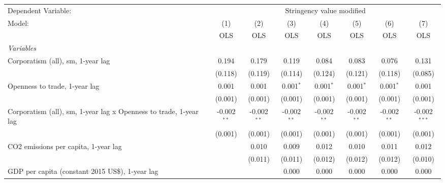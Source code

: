 
\begingroup
\centering
\begin{tabular}{lccccccc}
   \toprule
   Dependent Variable: & \multicolumn{7}{c}{Stringency value modified}\\
   Model:                                                            & (1)           & (2)           & (3)           & (4)           & (5)           & (6)           & (7)\\  
                                                                     &  OLS          & OLS           & OLS           & OLS           & OLS           & OLS           & OLS\\  
   \midrule
   \emph{Variables}\\
   Corporatism (all), sm, 1-year lag                                 & 0.194         & 0.179         & 0.119         & 0.084         & 0.083         & 0.076         & 0.131\\   
                                                                     & (0.118)       & (0.119)       & (0.114)       & (0.124)       & (0.121)       & (0.118)       & (0.085)\\   
   Openness to trade, 1-year lag                                     & 0.001         & 0.001         & 0.001$^{*}$   & 0.001$^{*}$   & 0.001$^{*}$   & 0.001$^{*}$   & 0.001\\   
                                                                     & (0.001)       & (0.001)       & (0.001)       & (0.001)       & (0.001)       & (0.001)       & (0.001)\\   
   Corporatism (all), sm, 1-year lag x Openness to trade, 1-year lag & -0.002$^{**}$ & -0.002$^{**}$ & -0.002$^{**}$ & -0.002$^{**}$ & -0.002$^{**}$ & -0.002$^{**}$ & -0.002$^{***}$\\   
                                                                     & (0.001)       & (0.001)       & (0.001)       & (0.001)       & (0.001)       & (0.001)       & (0.001)\\   
   CO2 emissions per capita, 1-year lag                              &               & 0.010         & 0.009         & 0.012         & 0.010         & 0.011         & 0.012\\   
                                                                     &               & (0.011)       & (0.011)       & (0.012)       & (0.012)       & (0.012)       & (0.010)\\   
   GDP per capita (constant 2015 US\$), 1-year lag                   &               &               & 0.000         & 0.000         & 0.000         & 0.000         & 0.000\\   

\end{tabular}
